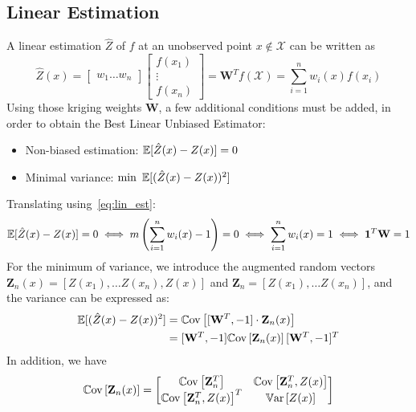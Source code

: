 \documentclass[../../Main_ManuscritThese.tex]{subfiles}
\begin{document}
\subsection{Linear Estimation}
\label{sec:linear_estimation}
A linear estimation $\hat{Z}$ of $f$ at an unobserved point $x\notin \mathcal{X}$ can be written as
\begin{equation}
  \label{eq:lin_est}
  \hat{Z}(x) =
  \begin{bmatrix}
    w_1 \dots w_n
    \end{bmatrix}
    \begin{bmatrix}
      f(x_1) \\ \vdots \\ f(x_n)
    \end{bmatrix} = \mathbf{W}^Tf(\mathcal{X}) = \sum_{i=1}^n w_i(x) f(x_i)
\end{equation}
Using those kriging weights $\mathbf{W}$, a few additional conditions must be added, in order to obtain the Best Linear Unbiased Estimator:
\begin{itemize}
\item Non-biased estimation: $\mathbb{E}[\hat{Z}(x) - Z(x)]=0$
\item Minimal variance: $\min~\mathbb{E}[(\hat{Z}(x) - Z(x))^2]$
\end{itemize}
Translating using~\cref{eq:lin_est}:
\begin{equation}
  \mathbb{E}[\hat{Z}(x) - Z(x)]=0 \iff m\left(\sum_{i=1}^n w_i(x)-1\right) = 0 \iff \sum_{i=1}^n w_i(x) = 1 \iff \mathbf{1}^T \mathbf{W} = 1
\end{equation}
For the minimum of variance, we introduce the augmented random vectors $\mathbf{Z}_n(x) = [Z(x_1),\dots Z(x_n), Z(x)]$ and $\mathbf{Z}_n = [Z(x_1),\dots Z(x_n)]$, and
the variance can be expressed as:
\begin{align}
  \mathbb{E}[(\hat{Z}(x) - Z(x))^2] &= \mathbb{C}\mathrm{ov}\left[[\mathbf{W}^T, -1] \cdot \mathbf{Z}_n(x) \right] \\
                             &= [\mathbf{W}^T, -1] \mathbb{C}\mathrm{ov}\left[\mathbf{Z}_n(x) \right] [\mathbf{W}^T, -1]^T
\end{align}
In addition, we have
\begin{equation}
  \mathbb{C}\mathrm{ov}\left[\mathbf{Z}_n(x) \right] =
  \begin{bmatrix}
    \mathbb{C}\mathrm{ov}\left[ \mathbf{Z}_n^T\right]
    & \mathbb{C}\mathrm{ov}\left[\mathbf{Z}_n^T, Z(x) \right]
  \\
  \mathbb{C}\mathrm{ov}\left[\mathbf{Z}_n^T, Z(x) \right]^T & \mathbb{V}\mathrm{ar}\left[Z(x)\right]
  \end{bmatrix}
\end{equation}
\end{document}
